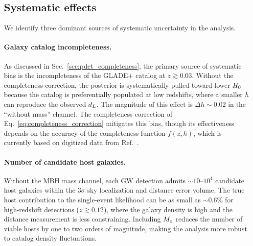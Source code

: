 \subsection{Systematic effects}
\label{sec:systematics}

We identify three dominant sources of systematic uncertainty in the
analysis.

\paragraph{Galaxy catalog incompleteness.}
As discussed in Sec.~\ref{sec:pdet_completeness}, the primary source of
systematic bias is the incompleteness of the GLADE+ catalog at
$z \gtrsim 0.03$. Without the completeness correction, the posterior is
systematically pulled toward lower $H_0$ because the catalog is
preferentially populated at low redshifts, where a smaller $h$ can
reproduce the observed $d_L$. The magnitude of this effect is
$\Delta h \sim 0.02$ in the ``without mass'' channel. The completeness
correction of Eq.~\eqref{eq:completeness_correction} mitigates this bias,
though its effectiveness depends on the accuracy of the completeness
function $f(z, h)$, which is currently based on digitized data from
Ref.~\cite{Dalya:2021ewn}.

\paragraph{Number of candidate host galaxies.}
Without the MBH mass channel, each GW detection admits $\sim 10$--$10^4$
candidate host galaxies within the $3\sigma$ sky localization and distance
error volume. The true host contribution to the single-event likelihood
can be as small as $\sim 0.6\%$ for high-redshift detections
($z \gtrsim 0.12$), where the galaxy density is high and the distance
measurement is less constraining. Including $M_z$ reduces the number of
viable hosts by one to two orders of magnitude, making the analysis more
robust to catalog density fluctuations.

